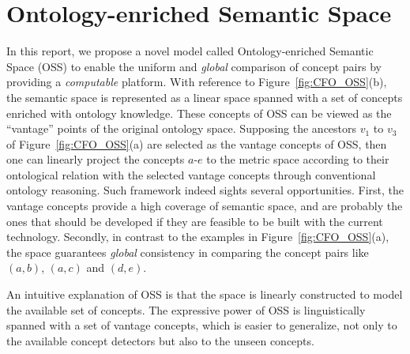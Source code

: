 \section{Ontology-enriched Semantic Space}
In this report, we propose a novel model called Ontology-enriched
Semantic Space (OSS) to enable the uniform and \emph{global}
comparison of concept pairs by providing a {\em computable}
platform. With reference to Figure~\ref{fig:CFO_OSS}(b), the
semantic space is represented as a linear space spanned with a set
of concepts enriched with ontology knowledge. These concepts of OSS
can be viewed as the ``vantage'' points
\cite{RobertoF.Santos.Filho:ICDE:2001,CaetanoTraina.Jr.:VLDB:2007}
\cite{Malcolm.Slaney:ICME:2002,A.Berenzweig:ICME:2003,Jules.Vleugels:PR:2002}
of the original ontology space. Supposing the ancestors $v_1$ to
$v_3$ of Figure~\ref{fig:CFO_OSS}(a) are selected as the vantage
concepts of OSS, then one can linearly project the concepts $a$-$e$
to the metric space according to their ontological relation with the
selected vantage concepts through conventional ontology reasoning.
Such framework indeed sights several opportunities. First, the
vantage concepts provide a high coverage of semantic space, and are
probably the ones that should be developed if they are feasible to
be built with the current technology. Secondly, in contrast to the
examples in Figure~\ref{fig:CFO_OSS}(a), the space guarantees
\emph{global} consistency in comparing the concept pairs like
$(a,b)$, $(a,c)$ and $(d,e)$.

An intuitive explanation of OSS is that the space is linearly
constructed to model the available set of concepts. The expressive
power of OSS is linguistically spanned with a set of vantage
concepts, which is easier to generalize, not only to the available
concept detectors but also to the unseen concepts.


